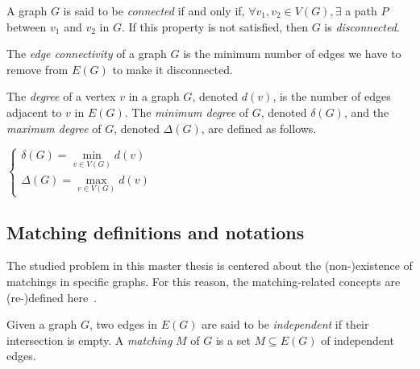 \begin{definition}
    \label{def:connected_graph}
    A graph $G$ is said to be \textit{connected} if and only if, $\forall v_1, v_2 \in V(G), \exists$ a path $P$ between $v_1$ and $v_2$ in $G$.
    If this property is not satisfied, then $G$ is \textit{disconnected}.
\end{definition}

\begin{definition}
    \label{def:edge_connectivity}
    The \textit{edge connectivity} of a graph $G$ is the minimum number of edges we have to remove from $E(G)$ to make it disconnected.
\end{definition}

\begin{definition}
    \label{def:degree}
    The \textit{degree} of a vertex $v$ in a graph $G$, denoted $d(v)$, is the number of edges adjacent to $v$ in $E(G)$.
    The \textit{minimum degree} of $G$, denoted $\delta(G)$, and the \textit{maximum degree} of $G$, denoted $\Delta(G)$, are defined as follows.
    \begin{center}
        $\left\{
        \begin{array}{l}
            \delta(G) = \min\limits_{v \in V(G)} d(v)\\
            \Delta(G) = \max\limits_{v \in V(G)} d(v)
        \end{array}
        \right.$
    \end{center}
\end{definition}


\subsection{Matching definitions and notations}
\label{subsec:matching-definitions-and-notations}

The studied problem in this master thesis is centered about the (non-)existence of matchings in specific graphs.
For this reason, the matching-related concepts are (re-)defined here~\cite{graphtheory}.

\begin{definition}[Matching]
    \label{def:matching}
    Given a graph $G$, two edges in $E(G)$ are said to be \textit{independent} if their intersection is empty.
    A \textit{matching} $M$ of $G$ is a set $M \subseteq E(G)$ of independent edges.
\end{definition}

